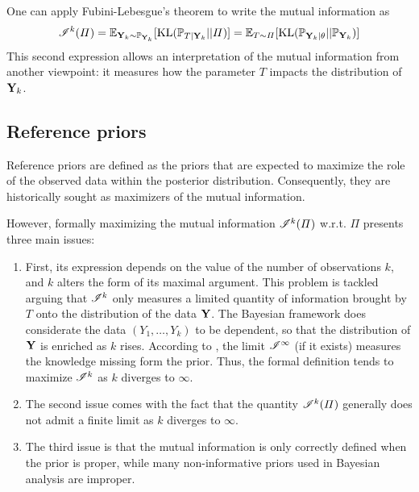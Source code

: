 One can apply Fubini-Lebesgue's theorem to write the mutual information as
\begin{equation}
    \mathscr{I}^k(\varPi) =  \mathbb{E}_{\mathbf{Y}_k\sim \mathbb{P}_{\mathbf{Y}_k}}[\text{KL}(\mathbb{P}_{T|\mathbf{Y}_k}||\varPi)] =  \mathbb{E}_{T\sim\varPi}[\text{KL}(\mathbb{P}_{\mathbf{Y}_k|\theta}||\mathbb{P}_{\mathbf{Y}_k}) ]
\end{equation}
This second expression allows an interpretation of the mutual information from another viewpoint: it measures how the parameter $T$ impacts the distribution of $\mathbf{Y}_k$.










\subsection{Reference priors}\label{sec:intro-ref:refpriors}

Reference priors are defined as the priors that are expected to maximize the role of the observed data within the posterior distribution.
Consequently, they are historically sought as maximizers of the mutual information.

However, formally maximizing the mutual information $\mathscr{I}^k(\varPi)$ w.r.t. $\varPi$ presents three main issues: %
\begin{enumerate}
    \item First, its expression depends on the value of the number of  observations $k$, and $k$ alters the form of its maximal argument. %
    This problem is tackled arguing that $\mathscr{I}^k$ only measures a limited quantity of information brought by $T$ onto the distribution of the data $\mathbf{Y}$. The Bayesian framework does considerate the data $(Y_1,\dots,Y_k)$ to be dependent, so that the distribution of $\mathbf{Y}$ is enriched as $k$ rises.
    According to \citet{bernardo_bayesian_1994}, the limit $\mathscr{I}^\infty$ (if it exists) measures the knowledge missing form the prior.
    Thus, the formal definition tends to maximize $\mathscr{I}^k$ as $k$ diverges to $\infty$.
    \item The second issue comes with the fact that the quantity $\mathscr{I}^k(\varPi)$ generally does not admit a finite limit as $k$ diverges to $\infty$.
    \item The third issue is that the mutual information is only correctly defined when the prior is proper, while many non-informative priors used in Bayesian analysis are improper.
\end{enumerate}

